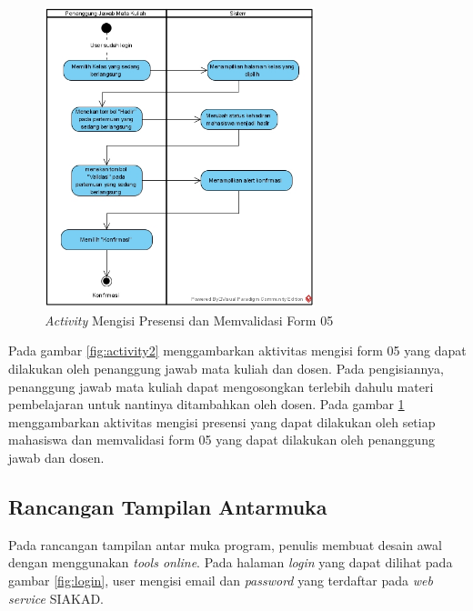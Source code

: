 \begin{figure}[h!]
	\centering
	\includegraphics[width=0.7\textwidth]{gambar/diagram/Mengisi Presensi dan Memvalidasi Form 05}
	\caption{\textit{Activity} Mengisi Presensi dan Memvalidasi Form 05}
	\label{fig:activity1}
\end{figure}

Pada gambar \ref{fig:activity2} menggambarkan aktivitas mengisi form 05 yang dapat dilakukan oleh penanggung jawab mata kuliah dan dosen. Pada pengisiannya, penanggung jawab mata kuliah dapat mengosongkan terlebih dahulu materi pembelajaran untuk nantinya ditambahkan oleh dosen.
Pada gambar \ref{fig:activity1} menggambarkan aktivitas mengisi presensi yang dapat dilakukan oleh setiap mahasiswa dan memvalidasi form 05 yang dapat dilakukan oleh penanggung jawab dan dosen.

\subsection{Rancangan Tampilan Antarmuka}

Pada rancangan tampilan antar muka program, penulis membuat desain awal dengan menggunakan \textit{tools online}. Pada halaman \textit{login} yang dapat dilihat pada gambar \ref{fig:login}, user mengisi email dan \textit{password} yang terdaftar pada \textit{web service} SIAKAD.

